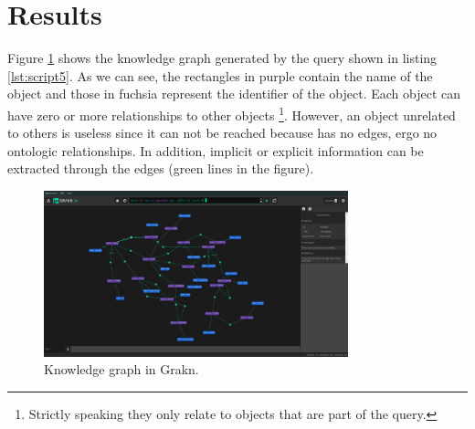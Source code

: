 \section{Results}
\label{sec:results}
Figure \ref{fig:grafGra} shows the knowledge graph generated by the query shown 
in listing \ref{lst:script5}. As we can see, the rectangles in purple 
contain the name of the object and those in fuchsia represent the identifier of 
the object. Each object can have zero or more relationships to other objects
\footnote{Strictly speaking they only relate to objects that are part of the 
query.}. However, an object unrelated to others is useless since it can
not be reached because has no edges, ergo no ontologic relationships. 
In addition, implicit or explicit information can be extracted through the 
edges (green lines in the figure).



\begin{figure}[H]
    \centering
    \includegraphics[width=8.8cm]{figures/allrel.png}
    \caption{Knowledge graph in Grakn.}
    \label{fig:grafGra}
\end{figure}

